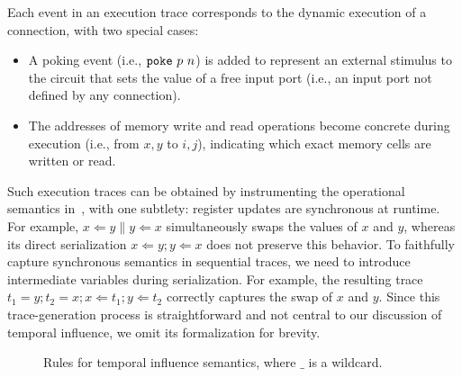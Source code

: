 Each event in an execution trace corresponds to the dynamic execution of a connection, with two special cases:
\begin{itemize}[leftmargin=*]
    \item
    A poking event (i.e., $\vpoke p\ n$) is added to represent an external stimulus to the circuit that sets the value of a free input port (i.e., an input port not defined by any connection).
    \item
    The addresses of memory write and read operations become concrete during execution (i.e., from $x,y$ to $i,j$), indicating which exact memory cells are written or read.
\end{itemize}
Such execution traces can be obtained by instrumenting the operational semantics in~\cite{cui_chisa_2026}, with one subtlety: register updates are synchronous at runtime.
For example, $x \Leftarrow y \parallel y \Leftarrow x$ simultaneously swaps the values of $x$ and $y$, whereas its direct serialization $x \Leftarrow y; y \Leftarrow x$ does not preserve this behavior.
To faithfully capture synchronous semantics in sequential traces, we need to introduce intermediate variables during serialization.
For example, the resulting trace $t_1 = y; t_2 = x; x \Leftarrow t_1; y \Leftarrow t_2$ correctly captures the swap of $x$ and $y$.
Since this trace-generation process is straightforward and not central to our discussion of temporal influence, we omit its formalization for brevity.

\begin{figure}[tp]
    \caption{Rules for temporal influence semantics, where $\_$ is a wildcard.}\label{fig:semantics}
\end{figure}

